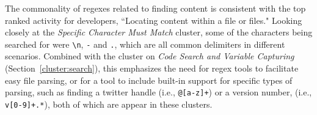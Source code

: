 The commonality of regexes related to finding content is consistent with the top ranked activity for developers, ``Locating content within a file or files." 
Looking closely at the \emph{Specific Character Must Match} cluster, some of the characters being searched for were \verb!\n!, \verb!-! and \verb!.!, which are all common delimiters in different scenarios. Combined with the cluster on \emph{Code Search and Variable Capturing} (Section~\ref{cluster:search}), this emphasizes the need for regex tools to  facilitate easy file parsing, or for a tool to include built-in support for specific types of parsing, such as finding a twitter handle (i.e., \verb!@[a-z]+!) or a version number, (i.e., \verb!v[0-9]+.*!), both of which are appear in these clusters. 


